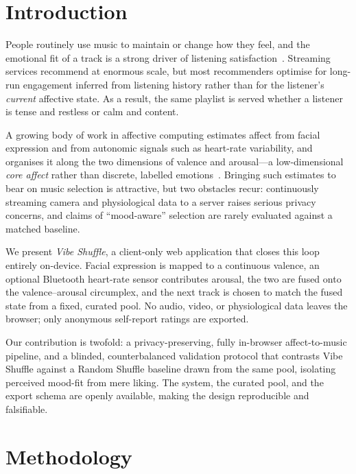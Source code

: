 \section{Introduction}

People routinely use music to maintain or change how they feel, and the
emotional fit of a track is a strong driver of listening
satisfaction~\cite{juslin2008}. Streaming services recommend at enormous scale,
but most recommenders optimise for long-run engagement inferred from listening
history rather than for the listener's \emph{current} affective state. As a
result, the same playlist is served whether a listener is tense and restless or
calm and content.

A growing body of work in affective computing estimates affect from facial
expression and from autonomic signals such as heart-rate variability, and
organises it along the two dimensions of valence and arousal---a low-dimensional
\emph{core affect} rather than discrete, labelled emotions~\cite{russell1980,
posner2005}. Bringing such estimates to bear on music
selection is attractive, but two obstacles recur: continuously streaming camera
and physiological data to a server raises serious privacy concerns, and claims of
``mood-aware'' selection are rarely evaluated against a matched baseline.

We present \emph{Vibe Shuffle}, a client-only web application that closes this
loop entirely on-device. Facial expression is mapped to a continuous valence, an
optional Bluetooth heart-rate sensor contributes arousal, the two are fused onto
the valence--arousal circumplex, and the next track is chosen to match the fused
state from a fixed, curated pool. No audio, video, or physiological data leaves
the browser; only anonymous self-report ratings are exported.

Our contribution is twofold: a privacy-preserving, fully in-browser affect-to-music
pipeline, and a blinded, counterbalanced validation protocol that contrasts Vibe
Shuffle against a Random Shuffle baseline drawn from the same pool, isolating
perceived mood-fit from mere liking. The system, the curated pool, and the export
schema are openly available, making the design reproducible and falsifiable.

\section{Methodology}

